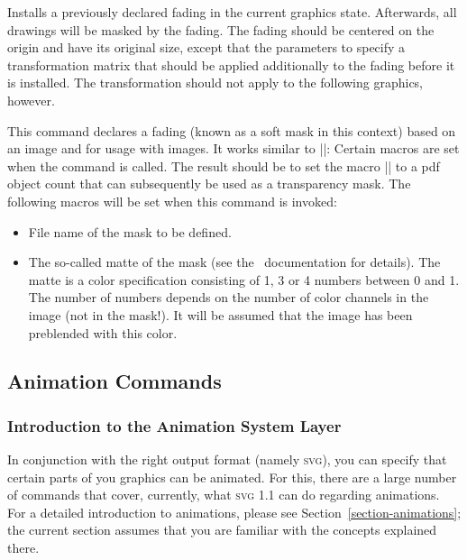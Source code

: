 \begin{command}{\pgfsys@usefading{}}
  Installs a previously declared fading  in the current
  graphics state. Afterwards, all drawings will be masked by the
  fading. The fading should be centered on the origin and have its
  original size, except that the parameters  to 
  specify a transformation matrix that should be applied additionally
  to the fading before it is installed. The transformation should not
  apply to the following graphics, however.
\end{command}


\begin{command}{\pgfsys@definemask}
  This command declares a fading (known as a soft mask in this
  context) based on an image and for usage with images. It
  works similar to |\pgfsys@defineimage|: Certain macros are set when
  the command is called. The result should be to set the macro
  |\pgf@mask| to a pdf object count that can subsequently be used as a
  transparency mask. The following macros will be set when this command is
  invoked:

  \begin{itemize}
  \item \declare{|\pgf@filename|}
    File name of the mask to be defined.

  \item \declare{|\pgf@maskmatte|}
    The so-called matte of the mask (see the \pdf\ documentation for
    details). The matte is a color specification consisting of 1, 3 or
    4 numbers between 0 and 1. The number of numbers depends on the
    number of color channels in the image (not in the mask!). It will
    be assumed that the image has been preblended with this color.
  \end{itemize}
\end{command}


\subsection{Animation Commands}

\subsubsection{Introduction to the Animation System Layer}

In conjunction with the right output format (namely
\textsc{svg}), you can specify that certain parts of you graphics can
be animated. For this, there are a large number of commands that
cover, currently, what \textsc{svg 1.1} can do regarding animations.
For a detailed introduction to animations, please see
Section~\ref{section-animations}; the current section assumes that you
are familiar with the concepts explained there.

